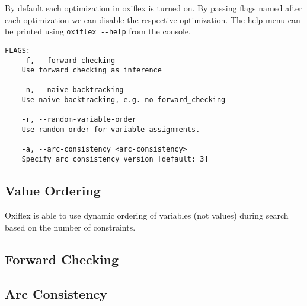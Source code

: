 By default each optimization in oxiflex is turned on. By passing flags named after each optimization we can disable the respective optimization. The help menu can be printed using \verb|oxiflex --help| from the console.

\begin{verbatim}
FLAGS:
    -f, --forward-checking
    Use forward checking as inference

    -n, --naive-backtracking
    Use naive backtracking, e.g. no forward_checking

    -r, --random-variable-order
    Use random order for variable assignments.

    -a, --arc-consistency <arc-consistency>
    Specify arc consistency version [default: 3]
\end{verbatim}

\subsection{Value Ordering}

Oxiflex is able to use dynamic ordering of variables (not values) during search based on the number of constraints.

\subsection{Forward Checking}

\subsection{Arc Consistency}

